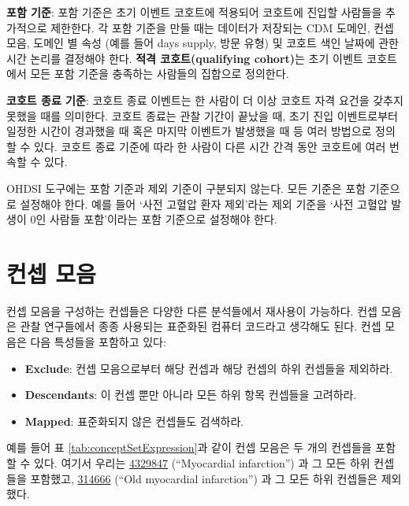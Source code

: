 \documentclass[11pt]{book}
\providecommand{\tightlist}{%
  \setlength{\itemsep}{0pt}\setlength{\parskip}{0pt}}
\theoremstyle{definition}
\theoremstyle{definition}
\theoremstyle{definition}
\theoremstyle{remark}
\let\BeginKnitrBlock\begin \let\EndKnitrBlock\end
\begin{document}
\textbf{포함 기준}: 포함 기준은 초기 이벤트 코호트에 적용되어 코호트에
진입할 사람들을 추가적으로 제한한다. 각 포함 기준을 만들 때는 데이터가
저장되는 CDM 도메인, 컨셉 모음, 도메인 별 속성 (예를 들어 days supply,
방문 유형) 및 코호트 색인 날짜에 관한 시간 논리를 결정해야 한다.
\textbf{적격 코호트(qualifying cohort)}는 초기 이벤트 코호트에서 모든
포함 기준을 충족하는 사람들의 집합으로 정의한다.

\textbf{코호트 종료 기준}: 코호트 종료 이벤트는 한 사람이 더 이상 코호트
자격 요건을 갖추지 못했을 때를 의미한다. 코호트 종료는 관찰 기간이
끝났을 때, 초기 진입 이벤트로부터 일정한 시간이 경과했을 때 혹은 마지막
이벤트가 발생했을 때 등 여러 방법으로 정의할 수 있다. 코호트 종료 기준에
따라 한 사람이 다른 시간 간격 동안 코호트에 여러 번 속할 수
있다.

\BeginKnitrBlock{rmdimportant}
OHDSI 도구에는 포함 기준과 제외 기준이 구분되지 않는다. 모든 기준은 포함
기준으로 설정해야 한다. 예를 들어 `사전 고혈압 환자 제외'라는 제외
기준을 `사전 고혈압 발생이 0인 사람들 포함'이라는 포함 기준으로 설정해야
한다.
\EndKnitrBlock{rmdimportant}

\section{컨셉 모음}\label{conceptSets}


컨셉 모음을 구성하는 컨셉들은 다양한 다른 분석들에서 재사용이 가능하다.
컨셉 모음은 관찰 연구들에서 종종 사용되는 표준화된 컴퓨터 코드라고
생각해도 된다. 컨셉 모음은 다음 특성들을 포함하고 있다:

\begin{itemize}
\tightlist
\item
  \textbf{Exclude}: 컨셉 모음으로부터 해당 컨셉과 해당 컨셉의 하위
  컨셉들을 제외하라.
\item
  \textbf{Descendants}: 이 컨셉 뿐만 아니라 모든 하위 항목 컨셉들을
  고려하라.
\item
  \textbf{Mapped}: 표준화되지 않은 컨셉들도 검색하라.
\end{itemize}

예를 들어 표 \ref{tab:conceptSetExpression}과 같이 컨셉 모음은 두 개의
컨셉들을 포함할 수 있다. 여기서 우리는
\href{http://athena.ohdsi.org/search-terms/terms/4329847}{4329847}
(``Myocardial infarction'') 과 그 모든 하위 컨셉들을 포함했고,
\href{http://athena.ohdsi.org/search-terms/terms/314666}{314666} (``Old
myocardial infarction'') 과 그 모든 하위 컨셉들은 제외했다.
\end{document}
